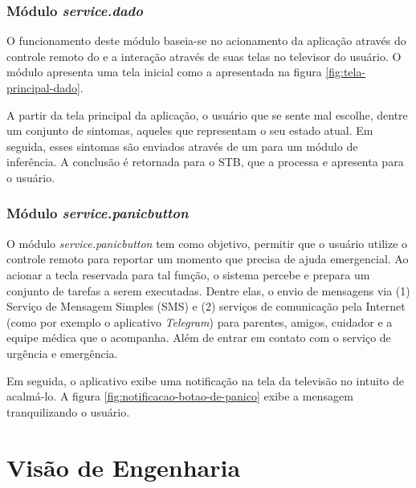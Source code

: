 \subsubsection{Módulo \textit{service.dado}}\label{subsubsec:dado}

O funcionamento deste módulo baseia-se no acionamento da aplicação através
do controle remoto do \stb[] e a interação através de suas telas no televisor
do usuário. O módulo apresenta uma tela inicial como a apresentada na 
figura \ref{fig:tela-principal-dado}.

A partir da tela principal da aplicação, o usuário que se sente mal escolhe, 
dentre um conjunto de sintomas, aqueles que representam o seu estado atual. Em
seguida, esses sintomas são enviados através de um \webservice[] para um
módulo de inferência. A conclusão é retornada para o STB, que a processa e 
apresenta para o usuário.


\subsubsection{Módulo \textit{service.panicbutton}}\label{subsubsec:panicbutton}

O módulo \textit{service.panicbutton} tem como objetivo, permitir que o usuário
utilize o controle remoto para reportar um momento que precisa de ajuda 
emergencial. Ao acionar a tecla reservada para tal função, o sistema percebe e
prepara um conjunto de tarefas a serem executadas. Dentre elas, o envio de 
mensagens via (1) Serviço de Mensagem Simples (SMS) e (2) serviços de comunicação
pela Internet (como por exemplo o aplicativo \textit{Telegram}) para parentes, 
amigos, cuidador e a equipe médica que o acompanha. Além de entrar em contato
com o serviço de urgência e emergência.

Em seguida, o aplicativo exibe uma notificação na tela da televisão no intuito
de acalmá-lo. A figura \ref{fig:notificacao-botao-de-panico} exibe a mensagem 
tranquilizando o usuário.


\section{Visão de Engenharia} \label{sec:visao-engenharia}


